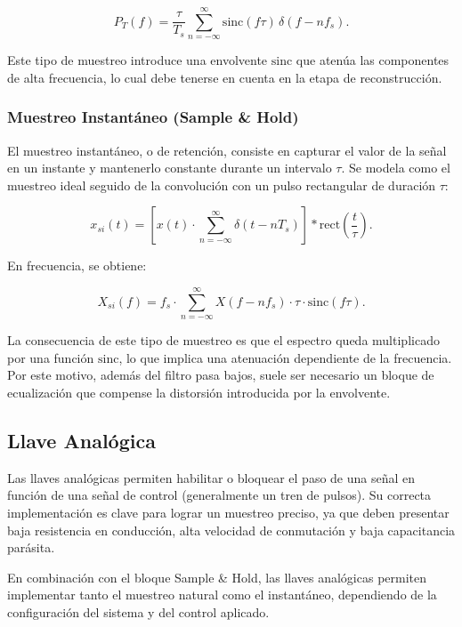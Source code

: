 \begin{equation}
    P_T(f) = \frac{\tau}{T_s} \sum_{n=-\infty}^{\infty} \text{sinc}(f\tau)\,\delta(f-nf_s).
\end{equation}

Este tipo de muestreo introduce una envolvente $\text{sinc}$ que atenúa las componentes de alta frecuencia, lo cual debe tenerse en cuenta en la etapa de reconstrucción.

\subsubsection{Muestreo Instantáneo (Sample \& Hold)}
El muestreo instantáneo, o de retención, consiste en capturar el valor de la señal en un instante y mantenerlo constante durante un intervalo $\tau$. Se modela como el muestreo ideal seguido de la convolución con un pulso rectangular de duración $\tau$:

\begin{equation}
    x_{si}(t) = \left[ x(t) \cdot \sum_{n=-\infty}^{\infty} \delta(t-nT_s) \right] * \text{rect}\left(\frac{t}{\tau}\right).
\end{equation}

En frecuencia, se obtiene:

\begin{equation}
    X_{si}(f) = f_s \cdot \sum_{n=-\infty}^{\infty} X(f-nf_s) \cdot \tau \cdot \text{sinc}(f\tau).
\end{equation}

La consecuencia de este tipo de muestreo es que el espectro queda multiplicado por una función $\text{sinc}$, lo que implica una atenuación dependiente de la frecuencia. Por este motivo, además del filtro pasa bajos, suele ser necesario un bloque de ecualización que compense la distorsión introducida por la envolvente.

\subsection{Llave Analógica}
Las llaves analógicas permiten habilitar o bloquear el paso de una señal en función de una señal de control (generalmente un tren de pulsos). Su correcta implementación es clave para lograr un muestreo preciso, ya que deben presentar baja resistencia en conducción, alta velocidad de conmutación y baja capacitancia parásita.

En combinación con el bloque Sample \& Hold, las llaves analógicas permiten implementar tanto el muestreo natural como el instantáneo, dependiendo de la configuración del sistema y del control aplicado.

